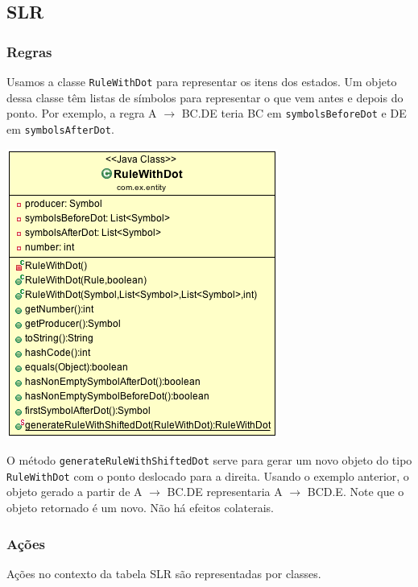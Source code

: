\documentclass[11pt]{article}
\begin{document}
\subsection{SLR}
\label{sec:orgheadline13}
\subsubsection{Regras}
\label{sec:orgheadline10}
Usamos a classe \texttt{RuleWithDot} para representar os itens dos estados.
Um objeto dessa classe têm listas de símbolos para representar o que vem antes e
depois do ponto. Por exemplo, a regra A \(\rightarrow\) BC.DE teria BC em
\texttt{symbolsBeforeDot} e DE em \texttt{symbolsAfterDot}.

\includegraphics[width=.9\linewidth]{./media/ruleWithDot.png}

O método \texttt{generateRuleWithShiftedDot} serve para gerar um novo objeto do tipo
\texttt{RuleWithDot} com o ponto deslocado para a direita. Usando o exemplo anterior, o
objeto gerado a partir de A \(\rightarrow\) BC.DE representaria A \(\rightarrow\) BCD.E.
Note que o objeto retornado é um novo. Não há efeitos colaterais.

\subsubsection{Ações}
\label{sec:orgheadline11}
Ações no contexto da tabela SLR são representadas por classes.
\end{document}
